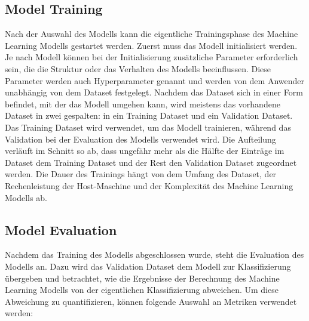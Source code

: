 \documentclass[conference]{IEEEtran}
\begin{document}
\newpage

\subsection{Model Training}

Nach der Auswahl des Modells kann die eigentliche Trainingsphase des Machine Learning Modells gestartet werden.
Zuerst muss das Modell initialisiert werden. Je nach Modell können bei der Initialisierung zusätzliche Parameter erforderlich sein, die die Struktur oder das Verhalten des Modells beeinflussen. Diese Parameter werden auch Hyperparameter genannt und werden von dem Anwender unabhängig von dem Dataset festgelegt.
Nachdem das Dataset sich in einer Form befindet, mit der das Modell umgehen kann, wird meistens das vorhandene Dataset in zwei gespalten: in ein Training Dataset und ein Validation Dataset.
Das Training Dataset wird verwendet, um das Modell trainieren, während das Validation bei der Evaluation des Modells verwendet wird. Die Aufteilung verläuft im Schnitt so ab, dass ungefähr mehr als die Hälfte der Einträge im Dataset dem Training Dataset und der Rest den Validation Dataset zugeordnet werden.
Die Dauer des Trainings hängt von dem Umfang des Dataset, der Rechenleistung der Host-Maschine und der Komplexität des Machine Learning Modells ab.

\subsection{Model Evaluation}

Nachdem das Training des Modells abgeschlossen wurde, steht die Evaluation des Modells an.
Dazu wird das Validation Dataset dem Modell zur Klassifizierung übergeben und betrachtet, wie die Ergebnisse der Berechnung des Machine Learning Modells von der eigentlichen Klassifizierung abweichen.
Um diese Abweichung zu quantifizieren, können folgende Auswahl an Metriken verwendet werden:
\end{document}
